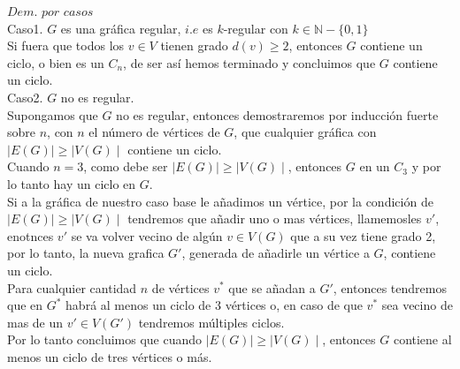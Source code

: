 \documentclass[12pt]{article}
\begin{document}
$Dem.$ $por$ $casos$\\

Caso1. $G$ es una gráfica regular, $i.e$ es $k$-regular con $k \in \mathbb{N} - \{0,1\}$\\

Si fuera que todos los $v \in V$ tienen grado $d(v) \geq 2$, entonces $G$ contiene un ciclo, o bien es un $C_n$, de ser así hemos terminado
y concluimos que $G$ contiene un ciclo.\\

Caso2. $G$ no es regular.\\

Supongamos que $G$ no es regular, entonces demostraremos por inducción fuerte sobre $n$, con $n$ 
el número de vértices de $G$, que cualquier gráfica con $\mid E(G) \mid \geq \mid V(G) \mid$ contiene un ciclo.\\

Cuando $n = 3$, como debe ser $\mid E(G) \mid \geq \mid V(G) \mid$, entonces $G$ en un $C_3$ y por lo tanto hay un ciclo en $G$.\\

Si a la gráfica de nuestro caso base le añadimos un vértice, por la condición de $\mid E(G) \mid \geq \mid V(G) \mid$
tendremos que añadir uno o mas vértices, llamemosles $v'$, enotnces $v'$ se va volver vecino 
de algún $v \in V(G)$ que a su vez tiene grado 2, por lo tanto, la nueva grafica $G'$, generada de añadirle un vértice 
a $G$, contiene un ciclo.\\

Para cualquier cantidad $n$ de vértices $v^{\ast}$ que se añadan a $G'$, entonces tendremos que en $G^{\ast}$ habrá al menos
un ciclo de 3 vértices o, en caso de que $v^{\ast}$ sea vecino de mas de un $v' \in V(G')$ tendremos múltiples ciclos.\\

Por lo tanto concluimos que cuando $\mid E(G) \mid \geq \mid V(G) \mid$, entonces $G$ contiene al menos un ciclo
de tres vértices o más.\\
\end{document}
